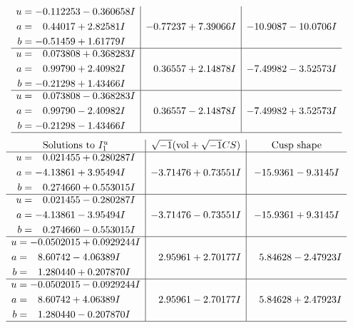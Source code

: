 \documentclass[1p]{elsarticle_modified}
\theoremstyle{definition}
\newcommand{\I}{\sqrt{-1}}
\begin{document}
$$\begin{array}{c|c|c}
\begin{aligned}
u &= -0.112253 - 0.360658 I \\
a &= \phantom{-}0.44017 + 2.82581 I \\
b &= -0.51459 + 1.61779 I\end{aligned}
 & -0.77237 + 7.39066 I & -10.9087 - 10.0706 I \\ \hline\begin{aligned}
u &= \phantom{-}0.073808 + 0.368283 I \\
a &= \phantom{-}0.99790 + 2.40982 I \\
b &= -0.21298 + 1.43466 I\end{aligned}
 & \phantom{-}0.36557 + 2.14878 I & -7.49982 - 3.52573 I \\ \hline\begin{aligned}
u &= \phantom{-}0.073808 - 0.368283 I \\
a &= \phantom{-}0.99790 - 2.40982 I \\
b &= -0.21298 - 1.43466 I\end{aligned}
 & \phantom{-}0.36557 - 2.14878 I & -7.49982 + 3.52573 I\\
 \hline 
 \end{array}$$\newpage$$\begin{array}{c|c|c}  
\text{Solutions to }I^u_{1}& \I (\text{vol} + \sqrt{-1}CS) & \text{Cusp shape}\\
 \hline 
\begin{aligned}
u &= \phantom{-}0.021455 + 0.280287 I \\
a &= -4.13861 + 3.95494 I \\
b &= \phantom{-}0.274660 + 0.553015 I\end{aligned}
 & -3.71476 + 0.73551 I & -15.9361 - 9.3145 I \\ \hline\begin{aligned}
u &= \phantom{-}0.021455 - 0.280287 I \\
a &= -4.13861 - 3.95494 I \\
b &= \phantom{-}0.274660 - 0.553015 I\end{aligned}
 & -3.71476 - 0.73551 I & -15.9361 + 9.3145 I \\ \hline\begin{aligned}
u &= -0.0502015 + 0.0929244 I \\
a &= \phantom{-}8.60742 - 4.06389 I \\
b &= \phantom{-}1.280440 + 0.207870 I\end{aligned}
 & \phantom{-}2.95961 + 2.70177 I & \phantom{-}5.84628 - 2.47923 I \\ \hline\begin{aligned}
u &= -0.0502015 - 0.0929244 I \\
a &= \phantom{-}8.60742 + 4.06389 I \\
b &= \phantom{-}1.280440 - 0.207870 I\end{aligned}
 & \phantom{-}2.95961 - 2.70177 I & \phantom{-}5.84628 + 2.47923 I\\
 \hline 
 \end{array}$$\newpage\newpage\renewcommand{\arraystretch}{1}
\end{document}
